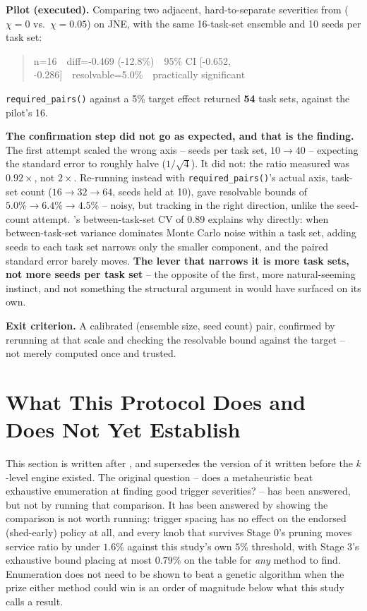 \documentclass{article}
\begin{document}
\textbf{Pilot (executed).} Comparing two adjacent, hard-to-separate severities
from  ($\chi = 0$ vs.\ $\chi = 0.05$) on JNE, with the same
16-task-set ensemble and 10 seeds per task set:

\begin{quote}
\ttfamily
n=16\ \ diff=-0.469 (-12.8\%)\ \ 95\% CI [-0.652, -0.286]\ \ resolvable=5.0\%\ \ practically significant
\end{quote}

\texttt{required\_pairs()} against a 5\% target effect returned \textbf{54}
task sets, against the pilot's 16.

\textbf{The confirmation step did not go as expected, and that is the
finding.} The first attempt scaled the wrong axis -- seeds per task set,
$10 \to 40$ -- expecting the standard error to roughly halve
($1/\sqrt{4}$). It did not: the ratio measured was $0.92\times$, not
$2\times$. Re-running instead with \texttt{required\_pairs()}'s actual axis,
task-set count ($16 \to 32 \to 64$, seeds held at 10), gave resolvable bounds
of $5.0\% \to 6.4\% \to 4.5\%$ -- noisy, but tracking in the right direction,
unlike the seed-count attempt. 's between-task-set
CV of 0.89 explains why directly: when between-task-set variance dominates
Monte Carlo noise within a task set, adding seeds to each task set narrows
only the smaller component, and the paired standard error barely moves.
\textbf{The lever that narrows it is more task sets, not more seeds per task
set} -- the opposite of the first, more natural-seeming instinct, and not
something the structural argument in  would have
surfaced on its own.

\textbf{Exit criterion.} A calibrated (ensemble size, seed count) pair,
confirmed by rerunning at that scale and checking the resolvable bound
against the target -- not merely computed once and trusted.

\section{What This Protocol Does and Does Not Yet Establish}
\label{sec:final-status}

This section is written after , and supersedes the
version of it written before the $k$-level engine existed. The original
question -- does a metaheuristic beat exhaustive enumeration at finding good
trigger severities? -- has been answered, but not by running that comparison.
It has been answered by showing the comparison is not worth running: trigger
spacing has no effect on the endorsed (shed-early) policy at all, and every
knob that survives Stage 0's pruning moves service ratio by under $1.6\%$
against this study's own $5\%$ threshold, with Stage 3's exhaustive bound
placing at most $0.79\%$ on the table for \emph{any} method to find. Enumeration
does not need to be shown to beat a genetic algorithm when the prize either
method could win is an order of magnitude below what this study calls a
result.
\end{document}
